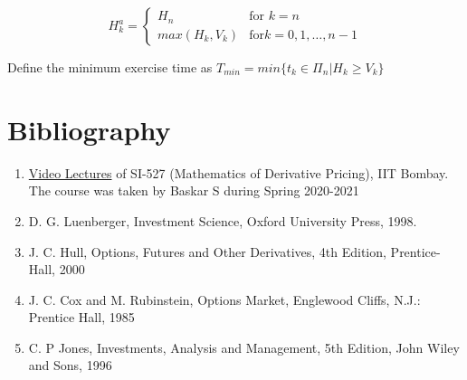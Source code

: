\documentclass{report}
\begin{document}
\[
H_k^a = \begin{cases}
    H_n & \text{for }k = n\\
    max(H_k, V_k) & \text{for} k = 0, 1, \dots, n-1
\end{cases}\]


Define the minimum exercise time as 
$T_{min} = min\{t_k \in \Pi_n | H_k \geq V_k\}$



\clearpage
\section*{Bibliography}
\begin{enumerate}
    \item \href{https://www.youtube.com/playlist?list=PLjAj1Z92T7LTcyjV-Di2_a4mij9_5fKkM}{Video Lectures} of SI-527 (Mathematics of Derivative Pricing), IIT Bombay. The course was taken by Baskar S during Spring 2020-2021
    \item D. G. Luenberger, Investment Science, Oxford University Press, 1998.
    \item J. C. Hull, Options, Futures and Other Derivatives, 4th Edition, Prentice-Hall, 2000
    \item J. C. Cox and M. Rubinstein, Options Market, Englewood Cliffs, N.J.: Prentice Hall, 1985
    \item C. P Jones, Investments, Analysis and Management, 5th Edition, John Wiley and Sons, 1996
\end{enumerate}
\end{document}
